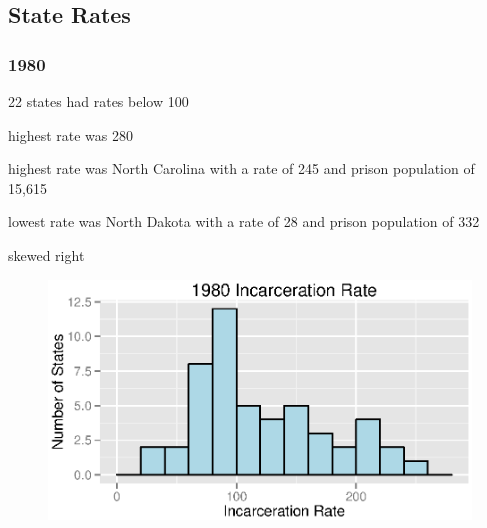 \documentclass{exam}
\begin{document}
  \pagebreak

  \subsection{State Rates}

  \subsubsection{1980}
  \begin{itemize*}
    \item 22 states had rates below 100
    \item highest rate was 280
    \item highest rate was North Carolina with a rate of 245 and prison population of 15,615
    \item lowest rate was North Dakota with a rate of 28 and prison population of 332
    \item skewed right
  \end{itemize*}

  \begin{figure}[H]
    \centering
    \includegraphics[scale = 0.9]{1980_rate_histogram.eps}
  \end{figure}
\end{document}
